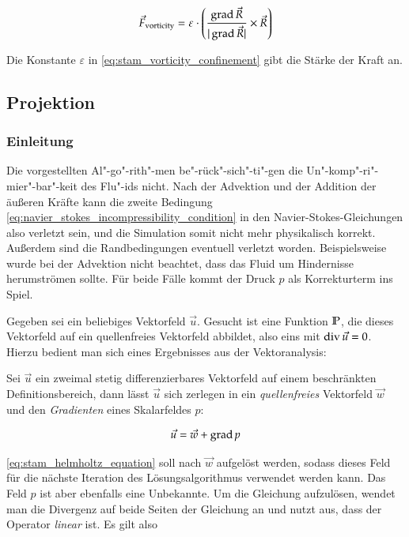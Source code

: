 \begin{equation}
\label{eq:stam_vorticity_confinement}
\vec{F}_{\textnormal{vorticity}}
=
\varepsilon \cdot
\left(
	\frac
	{
		\operatorname*{grad} \vec{R}
	}
	{
		|\operatorname*{grad} \vec{R}|
	}
	\times
	\vec{R}
\right)
\end{equation}

Die Konstante $\varepsilon$ in \autoref{eq:stam_vorticity_confinement} gibt die
Stärke der Kraft an.

\subsection{Projektion}

\subsubsection{Einleitung}

Die vorgestellten Al"-go"-rith"-men be"-rück"-sich"-ti"-gen die
Un"-komp"-ri"-mier"-bar"-keit des Flu"-ids nicht. Nach der Advektion und der
Addition der äußeren Kräfte kann die zweite Bedingung
\ref{eq:navier_stokes_incompressibility_condition} in den
Navier-Stokes-Gleichungen also verletzt sein, und die Simulation somit nicht
mehr physikalisch korrekt. Außerdem sind die Randbedingungen eventuell verletzt
worden. Beispielsweise wurde bei der Advektion nicht beachtet, dass das Fluid um
Hindernisse herumströmen sollte. Für beide Fälle kommt der Druck $p$ als
Korrekturterm ins Spiel.

Gegeben sei ein beliebiges Vektorfeld $\vec{u}$. Gesucht ist eine Funktion
$\mathbb{P}$, die dieses Vektorfeld auf ein quellenfreies Vektorfeld
abbildet, also eins mit $\operatorname*{div} \vec{u} = 0$. Hierzu bedient man sich eines
Ergebnisses aus der Vektoranalysis:

\begin{PimiddySatz}
Sei $\vec{u}$ ein zweimal stetig differenzierbares Vektorfeld auf einem
beschränkten Definitionsbereich, dann lässt $\vec{u}$ sich zerlegen in
ein \emph{quellenfreies} Vektorfeld $\vec{w}$ und den \emph{Gradienten}
eines Skalarfeldes $p$:

\begin{equation}
\label{eq:stam_helmholtz_equation}
\vec{u} = \vec{w} + \operatorname*{grad} p
\end{equation}
\end{PimiddySatz}

\autoref{eq:stam_helmholtz_equation} soll nach $\vec{w}$ aufgelöst werden, sodass
dieses Feld für die nächste Iteration des Lösungsalgorithmus verwendet werden
kann. Das Feld $p$ ist aber ebenfalls eine Unbekannte. Um die Gleichung
aufzulösen, wendet man die Divergenz auf beide Seiten der Gleichung an und nutzt
aus, dass der Operator \emph{linear} ist. Es gilt also


